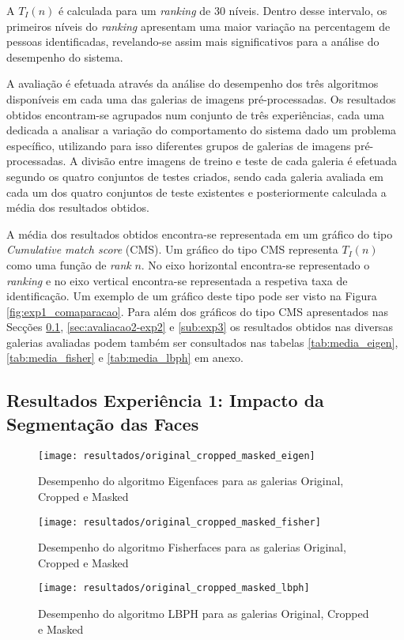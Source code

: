 A $T_{I}(n)$ é calculada para um \textit{ranking} de 30 níveis. Dentro desse intervalo, os primeiros níveis do \textit{ranking} apresentam uma maior variação na percentagem de pessoas identificadas, revelando-se assim mais significativos para a análise do desempenho do sistema.

A avaliação é efetuada através da análise do desempenho dos três algoritmos disponíveis em cada uma das galerias de imagens pré-processadas. Os resultados obtidos encontram-se agrupados num conjunto de três experiências, cada uma dedicada a analisar a variação do comportamento do sistema dado um problema específico, utilizando para isso diferentes grupos de galerias de imagens pré-processadas. A divisão entre imagens de treino e teste de cada galeria é efetuada segundo os quatro conjuntos de testes criados, sendo cada galeria avaliada em cada um dos quatro conjuntos de teste existentes e posteriormente calculada a média dos resultados obtidos.

A média dos resultados obtidos encontra-se representada em um gráfico do tipo \textit{Cumulative match score} (CMS). Um gráfico do tipo CMS representa $T_{I}(n)$ como uma função de \textit{rank} $n$. No eixo horizontal encontra-se representado o \textit{ranking} e no eixo vertical encontra-se representada a respetiva taxa de identificação. Um exemplo de um gráfico deste tipo pode ser visto na Figura \ref{fig:exp1_comaparacao}. Para além dos gráficos do tipo CMS apresentados nas Secções \ref{sub:exp1}, \ref{sec:avaliacao2-exp2} e \ref{sub:exp3} os resultados obtidos nas diversas galerias avaliadas podem também ser consultados nas tabelas \ref{tab:media_eigen}, \ref{tab:media_fisher} e \ref{tab:media_lbph} em anexo.

\subsection{Resultados Experiência 1: Impacto da Segmentação das Faces} \label{sub:exp1}

        \begin{figure}[ht]
                \centering
                \texttt{[image: resultados/original\_cropped\_masked\_eigen]}
                \caption{Desempenho do algoritmo Eigenfaces para as galerias Original, Cropped e Masked}
                \label{fig:original_cropped_masked_eigen}
        \end{figure}%

        \begin{figure}[p]
                \centering
                \texttt{[image: resultados/original\_cropped\_masked\_fisher]}
                \caption{Desempenho do algoritmo Fisherfaces para as galerias Original, Cropped e Masked}
                \label{fig:original_cropped_masked_fisher}
                \centering
                \texttt{[image: resultados/original\_cropped\_masked\_lbph]}
                \caption{Desempenho do algoritmo LBPH para as galerias Original, Cropped e Masked}
                \label{fig:original_cropped_masked_lbph}
        \end{figure}%
        

